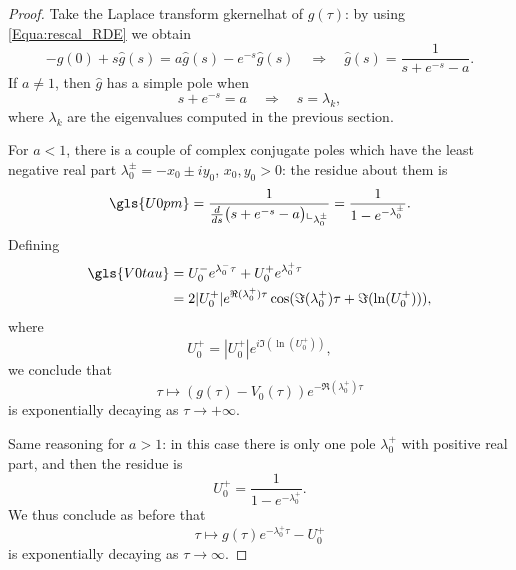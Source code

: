 \documentclass[reqno]{amsart}
\theoremstyle{definition} \newtheorem{definition}{Definition}[section]
\theoremstyle{definition} \newtheorem{remark}[definition]{Remark}
\theoremstyle{plain} \newtheorem{lemma}[definition]{Lemma}
\theoremstyle{plain} \newtheorem{proposition}[definition]{Proposition}
\theoremstyle{plain} \newtheorem{theorem}[definition]{Theorem}
\theoremstyle{plain} \newtheorem{corollary}[definition]{Corollary}
\theoremstyle{definition} \newtheorem{example}[definition]{Example}
\theoremstyle{plain} \newtheorem{claim}[clai]{Claim}
\theoremstyle{definition} \newtheorem{assumption}[definition]{Assumption}
\theoremstyle{definition} \newtheorem{observation}[definition]{Observation}
\newcommand{\1}{\mathbbm 1}
\newcommand{\rest}{\llcorner}
\numberwithin{equation}{section} %
\theoremstyle{plain} \newtheorem*{theorem*}{Theorem}
\theoremstyle{plain} \newtheorem{mthm}[maintheorem]{Main Theorem}
\theoremstyle{plain} \newtheorem*{mthm*}{Main Theorem}
\theoremstyle{plain} \newtheorem*{conjecture*}{Conjecture}
\theoremstyle{plain} \newtheorem{conjecture}[definition]{Conjecture}
\theoremstyle{plain} \newtheorem*{problem*}{Problem}
\begin{document}
\begin{proof}
Take the Laplace transform  \gls{gkernelhat} of $g(\tau)$: by using \eqref{Equa:rescal_RDE} we obtain
\begin{equation*}
- g(0) + s \hat g(s) = a \hat g(s) - e^{-s} \hat g(s) \quad \Longrightarrow \quad \hat g(s) = \frac{1}{s + e^{-s} - a}.
\end{equation*}
If $a \not= 1$, then $\hat g$ has a simple pole when %
\begin{equation*}
s + e^{-s} = a \quad \Longrightarrow \quad s = \lambda_k,
\end{equation*}
where $\lambda_k$ are the eigenvalues computed in the previous section. %

For $a < 1$, there is a couple of complex conjugate poles which have the least negative real part $\lambda_0^\pm = - x_0 \pm i y_0$, $x_0,y_0 > 0$: the residue about them is 
\begin{equation*}
\gls{U0pm} = \frac{1}{\frac{d}{ds} \big( s + e^{-s} - a \big) \rest_{\lambda_0^\pm}} = \frac{1}{1 - e^{-\lambda_0^\pm}}. %
\end{equation*}
Defining 
\begin{align*}
\gls{V0tau} &= U_0^- e^{\lambda_0^- \tau} + U_0^+ e^{\lambda_0^+ \tau} \\
&= 2 |U_0^+| e^{\Re(\lambda_0^+) \tau} \cos(\Im(\lambda_0^+) \tau + \Im(\ln(U_0^+))),
\end{align*}
where
\begin{equation*}
U_0^+ = |U_0^+| e^{i\Im(\ln(U_0^+))},
\end{equation*}
we conclude that
\begin{equation*}
\tau \mapsto (g(\tau) - V_0(\tau)) e^{- \Re(\lambda_0^+) \tau}
\end{equation*}
is exponentially decaying as $\tau \to +\infty$.

Same reasoning for $a > 1$: in this case there is only one pole $\lambda_0^+$ with positive real part, and then the residue is
\begin{equation*}
U_0^+ = \frac{1}{1 - e^{-\lambda_0^+}}.
\end{equation*}
We thus conclude as before that
\begin{equation*}
\tau \mapsto g(\tau) e^{-\lambda_0^+ \tau} - U_0^+
\end{equation*}
is exponentially decaying as $\tau \to \infty$.


\end{proof}
\end{document}

